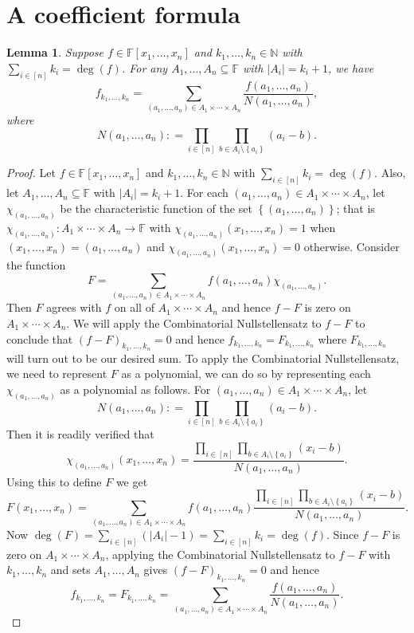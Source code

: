 \documentclass[openany]{tufte-book} %
\theoremstyle{plain}
\newtheorem{lemma}{Lemma}
\newcommand{\set}[1]{\left\{ #1 \right\}}
\newcommand{\card}[1]{\left|#1\right|}
\newcommand{\func}[3]{#1\colon #2 \rightarrow #3}
\newcommand{\irange}[1]{\left[#1\right]}
\newcommand{\DefinedAs}{\mathrel{\mathop:}=}
\newcommand{\IN}{\mathbb{N}}
\begin{document}
\section{A coefficient formula}
\begin{lemma}
Suppose $f \in \mathbb{F}[x_1, \ldots, x_n]$ and $k_1, \ldots, k_n \in \IN$ with $\sum_{i \in \irange{n}} k_i = \deg(f)$.  For any $A_1, \ldots, A_n \subseteq \mathbb{F}$ with $\card{A_i} = k_i + 1$, we have
\[f_{k_1, \ldots, k_n} = \sum_{(a_1, \ldots, a_n) \in A_1 \times \cdots \times A_n} \frac{f(a_1, \ldots, a_n)}{N(a_1, \ldots, a_n)},\]
where
\[N(a_1, \ldots, a_n) \DefinedAs \prod_{i \in \irange{n}} \prod_{b \in A_i \setminus \set{a_i}} (a_i - b).\]
\end{lemma}
\begin{proof}
Let $f \in \mathbb{F}[x_1, \ldots, x_n]$ and $k_1, \ldots, k_n \in \IN$ with $\sum_{i \in \irange{n}} k_i = \deg(f)$. Also, let $A_1, \ldots, A_n \subseteq \mathbb{F}$ with $\card{A_i} = k_i + 1$.  For each $(a_1, \ldots, a_n) \in A_1 \times \cdots \times A_n$, let $\chi_{(a_1, \ldots, a_n)}$ be the characteristic function of the set $\set{(a_1, \ldots, a_n)}$; that is $\func{\chi_{(a_1, \ldots, a_n)}}{A_1 \times \cdots \times A_n}{\mathbb{F}}$ with $\chi_{(a_1, \ldots, a_n)}(x_1, \ldots, x_n) = 1$ when $(x_1, \ldots, x_n) = (a_1, \ldots, a_n)$ and $\chi_{(a_1, \ldots, a_n)}(x_1, \ldots, x_n) = 0$ otherwise.  Consider the function
\[F = \sum_{(a_1, \ldots, a_n) \in A_1 \times \cdots \times A_n} f(a_1, \ldots, a_n)\chi_{(a_1, \ldots, a_n)}.\]
Then $F$ agrees with $f$ on all of $A_1 \times \cdots \times A_n$ and hence $f - F$ is zero on $A_1 \times \cdots \times A_n$.  We will apply the Combinatorial Nullstellensatz to $f - F$ to conclude that $(f-F)_{k_1, \ldots, k_n} = 0$ and hence $f_{k_1, \ldots, k_n} = F_{k_1, \ldots, k_n}$ where  $F_{k_1, \ldots, k_n}$ will turn out to be our desired sum.  To apply the Combinatorial Nullstellensatz, we need to represent $F$ as a polynomial, we can do so by representing each $\chi_{(a_1, \ldots, a_n)}$ as a polynomial as follows.  For $(a_1, \ldots, a_n) \in A_1 \times \cdots \times A_n$, let 
\[N(a_1, \ldots, a_n) \DefinedAs \prod_{i \in \irange{n}} \prod_{b \in A_i \setminus \set{a_i}} (a_i - b).\]
\noindent Then it is readily verified that
\[\chi_{(a_1, \ldots, a_n)}(x_1, \ldots, x_n) = \frac{\prod_{i \in \irange{n}} \prod_{b \in A_i \setminus \set{a_i}} (x_i - b)}{N(a_1, \ldots, a_n)}.\]
\noindent Using this to define $F$ we get 
\[F(x_1, \ldots, x_n) = \sum_{(a_1, \ldots, a_n) \in A_1 \times \cdots \times A_n} f(a_1, \ldots, a_n)\frac{\prod_{i \in \irange{n}} \prod_{b \in A_i \setminus \set{a_i}} (x_i - b)}{N(a_1, \ldots, a_n)}.\]
Now  $\deg(F) = \sum_{i \in \irange{n}} (|A_i| - 1) = \sum_{i \in \irange{n}} k_i = \deg(f)$.  Since $f - F$ is zero on $A_1 \times \cdots \times A_n$, applying the Combinatorial Nullstellensatz to $f - F$ with $k_1, \ldots, k_n$ and sets $A_1, \ldots, A_n$ gives $(f-F)_{k_1, \ldots, k_n} = 0$ and hence 
\[f_{k_1, \ldots, k_n} = F_{k_1, \ldots, k_n} = \sum_{(a_1, \ldots, a_n) \in A_1 \times \cdots \times A_n} \frac{f(a_1, \ldots, a_n)}{N(a_1, \ldots, a_n)}.\]
\end{proof}
\end{document}
